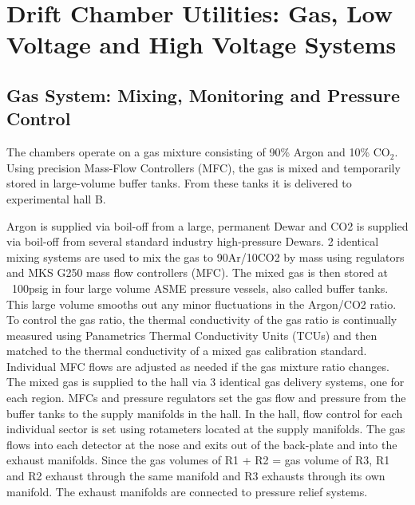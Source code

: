 \section{Drift Chamber Utilities: Gas, Low Voltage and High Voltage Systems}

\subsection{Gas System: Mixing, Monitoring and Pressure Control}

The chambers operate on a gas mixture consisting of 90\% Argon and 10\% CO$_2$.
Using precision Mass-Flow Controllers (MFC), the gas is mixed and temporarily
stored in large-volume buffer tanks.  From these tanks it is delivered
to experimental hall B.  

Argon is supplied via boil-off from a large, permanent Dewar and CO2 is supplied 
via boil-off from several standard industry high-pressure Dewars. 2 identical mixing
systems are used to mix the gas to 90Ar/10CO2 by mass using regulators and MKS G250 
mass flow controllers (MFC).  The mixed gas is then stored at ~100psig in four large 
volume ASME pressure vessels, also called buffer tanks. This large volume smooths out 
any minor fluctuations in the Argon/CO2 ratio. To control the gas ratio, the thermal 
conductivity of the gas ratio is continually measured using Panametrics Thermal 
Conductivity Units (TCUs) and then matched to the thermal conductivity of a mixed 
gas calibration standard. Individual MFC flows are adjusted as needed if the gas mixture
ratio changes. The mixed gas is supplied to the hall via 3 identical gas delivery systems, 
one for each region. MFCs and pressure regulators set the gas flow and pressure from the 
buffer tanks to the supply manifolds in the hall. In the hall, flow control for each 
individual sector is set using rotameters located at the supply manifolds. The gas flows 
into each detector at the nose and exits out of the back-plate and into the exhaust 
manifolds. Since the gas volumes of R1 + R2 = gas volume of R3, R1 and R2 exhaust 
through the same manifold and R3 exhausts through its own manifold. The exhaust manifolds 
are connected to pressure relief systems. 

